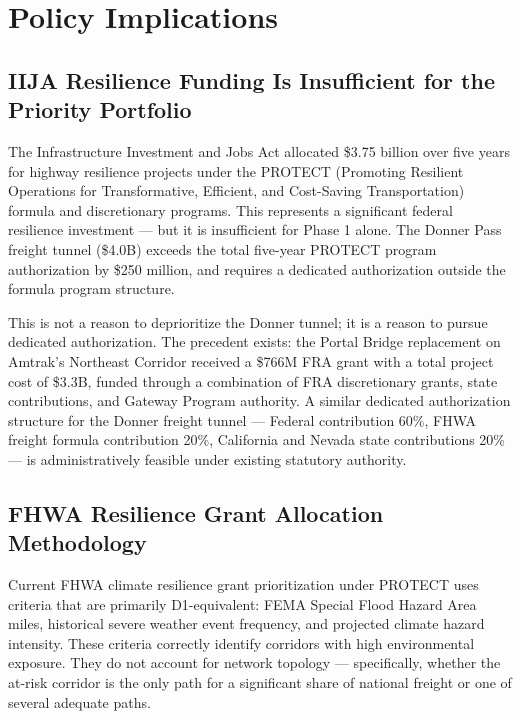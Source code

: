 \section{Policy Implications}
\label{sec:policy-implications}

\subsection{IIJA Resilience Funding Is Insufficient for the Priority Portfolio}

The Infrastructure Investment and Jobs Act \citep{IIJA2021} allocated \$3.75 billion over five years for highway resilience projects under the PROTECT (Promoting Resilient Operations for Transformative, Efficient, and Cost-Saving Transportation) formula and discretionary programs. This represents a significant federal resilience investment --- but it is insufficient for Phase 1 alone. The Donner Pass freight tunnel (\$4.0B) exceeds the total five-year PROTECT program authorization by \$250 million, and requires a dedicated authorization outside the formula program structure.

This is not a reason to deprioritize the Donner tunnel; it is a reason to pursue dedicated authorization. The precedent exists: the Portal Bridge replacement on Amtrak's Northeast Corridor received a \$766M FRA grant with a total project cost of \$3.3B, funded through a combination of FRA discretionary grants, state contributions, and Gateway Program authority. A similar dedicated authorization structure for the Donner freight tunnel --- Federal contribution 60\%, FHWA freight formula contribution 20\%, California and Nevada state contributions 20\% --- is administratively feasible under existing statutory authority.

\subsection{FHWA Resilience Grant Allocation Methodology}

Current FHWA climate resilience grant prioritization under PROTECT uses criteria that are primarily D1-equivalent: FEMA Special Flood Hazard Area miles, historical severe weather event frequency, and projected climate hazard intensity. These criteria correctly identify corridors with high environmental exposure. They do not account for network topology --- specifically, whether the at-risk corridor is the only path for a significant share of national freight or one of several adequate paths.

